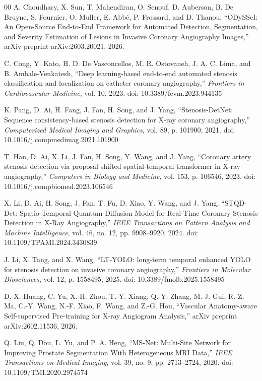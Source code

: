 \documentclass[conference]{IEEEtran}
\begin{document}
\begin{thebibliography}{00}
 A. Choudhary, X. Sun, T. Mahendiran, O. Senouf, D. Auberson, B. De Bruyne, S. Fournier, O. Muller, E. Abbé, P. Frossard, and D. Thanou, ``ODySSeI: An Open-Source End-to-End Framework for Automated Detection, Segmentation, and Severity Estimation of Lesions in Invasive Coronary Angiography Images,'' arXiv preprint arXiv:2603.20021, 2026.

 C. Cong, Y. Kato, H. D. De Vasconcellos, M. R. Ostovaneh, J. A. C. Lima, and B. Ambale-Venkatesh, ``Deep learning-based end-to-end automated stenosis classification and localization on catheter coronary angiography,'' \textit{Frontiers in Cardiovascular Medicine}, vol. 10, 2023. doi: 10.3389/fcvm.2023.944135

 K. Pang, D. Ai, H. Fang, J. Fan, H. Song, and J. Yang, ``Stenosis-DetNet: Sequence consistency-based stenosis detection for X-ray coronary angiography,'' \textit{Computerized Medical Imaging and Graphics}, vol. 89, p. 101900, 2021. doi: 10.1016/j.compmedimag.2021.101900

 T. Han, D. Ai, X. Li, J. Fan, H. Song, Y. Wang, and J. Yang, ``Coronary artery stenosis detection via proposal-shifted spatial-temporal transformer in X-ray angiography,'' \textit{Computers in Biology and Medicine}, vol. 153, p. 106546, 2023. doi: 10.1016/j.compbiomed.2023.106546

 X. Li, D. Ai, H. Song, J. Fan, T. Fu, D. Xiao, Y. Wang, and J. Yang, ``STQD-Det: Spatio-Temporal Quantum Diffusion Model for Real-Time Coronary Stenosis Detection in X-Ray Angiography,'' \textit{IEEE Transactions on Pattern Analysis and Machine Intelligence}, vol. 46, no. 12, pp. 9908--9920, 2024. doi: 10.1109/TPAMI.2024.3430839

 J. Li, X. Tang, and X. Wang, ``LT-YOLO: long-term temporal enhanced YOLO for stenosis detection on invasive coronary angiography,'' \textit{Frontiers in Molecular Biosciences}, vol. 12, p. 1558495, 2025. doi: 10.3389/fmolb.2025.1558495

 D.-X. Huang, C. Yu, X.-H. Zhou, T.-Y. Xiang, Q.-Y. Zhang, M.-J. Gui, R.-Z. Ma, C.-Y. Wang, N.-F. Xiao, F. Wang, and Z.-G. Hou, ``Vascular Anatomy-aware Self-supervised Pre-training for X-ray Angiogram Analysis,'' arXiv preprint arXiv:2602.11536, 2026.

 Q. Liu, Q. Dou, L. Yu, and P. A. Heng, ``MS-Net: Multi-Site Network for Improving Prostate Segmentation With Heterogeneous MRI Data,'' \textit{IEEE Transactions on Medical Imaging}, vol. 39, no. 9, pp. 2713--2724, 2020. doi: 10.1109/TMI.2020.2974574


\end{thebibliography}
\end{document}
